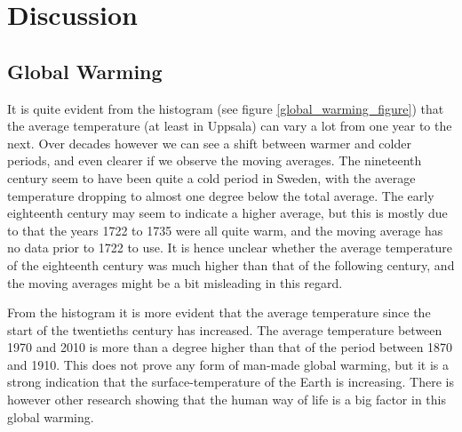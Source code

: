 \section{Discussion}

\subsection{Global Warming}

It is quite evident from the histogram (see figure \ref{global_warming_figure}) that the average temperature (at least in Uppsala) can vary a lot from one year to the next. Over decades however we can see a shift between warmer and colder periods, and even clearer if we observe the moving averages. The nineteenth century seem to have been quite a cold period in Sweden, with the average temperature dropping to almost one degree below the total average. The early eighteenth century may seem to indicate a higher average, but this is mostly due to that the years 1722 to 1735 were all quite warm, and the moving average has no data prior to 1722 to use. It is hence unclear whether the average temperature of the eighteenth century was much higher than that of the following century, and the moving averages might be a bit misleading in this regard.

From the histogram it is more evident that the average temperature since the start of the twentieths century has increased. The average temperature between 1970 and 2010 is more than a degree higher than that of the period between 1870 and 1910. This does not prove any form of man-made global warming, but it is a strong indication that the surface-temperature of the Earth is increasing. There is however other research showing that the human way of life is a big factor in this global warming.
